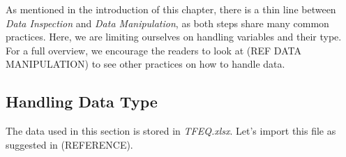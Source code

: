 \documentclass[
]{book}
\newenvironment{Shaded}{\begin{snugshade}}{\end{snugshade}}
\newcommand{\AttributeTok}[1]{\textcolor[rgb]{0.77,0.63,0.00}{#1}}
\newcommand{\DecValTok}[1]{\textcolor[rgb]{0.00,0.00,0.81}{#1}}
\newcommand{\FunctionTok}[1]{\textcolor[rgb]{0.00,0.00,0.00}{#1}}
\newcommand{\NormalTok}[1]{#1}
\newcommand{\OtherTok}[1]{\textcolor[rgb]{0.56,0.35,0.01}{#1}}
\newcommand{\SpecialCharTok}[1]{\textcolor[rgb]{0.00,0.00,0.00}{#1}}
\newcommand{\StringTok}[1]{\textcolor[rgb]{0.31,0.60,0.02}{#1}}
\begin{document}
As mentioned in the introduction of this chapter, there is a thin line between \emph{Data Inspection} and \emph{Data Manipulation}, as both steps share many common practices. Here, we are limiting ourselves on handling variables and their type. For a full overview, we encourage the readers to look at (REF DATA MANIPULATION) to see other practices on how to handle data.

\hypertarget{handling-data-type}{%
\subsection{Handling Data Type}\label{handling-data-type}}

The data used in this section is stored in \emph{TFEQ.xlsx}. Let's import this file as suggested in (REFERENCE).

\begin{Shaded}
\end{Shaded}
\end{document}

